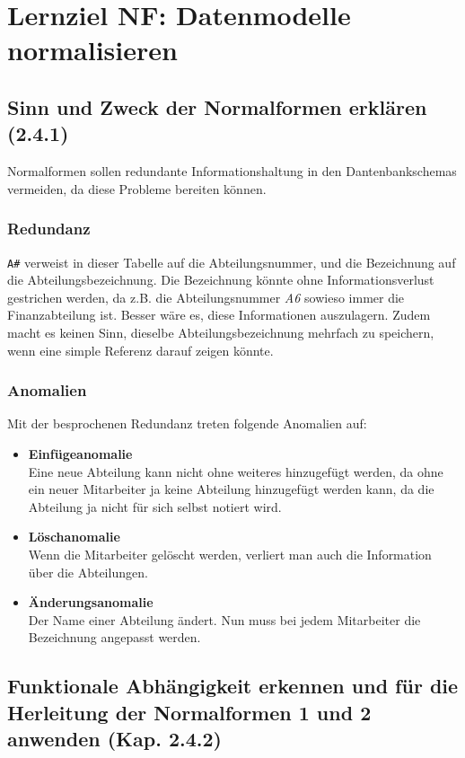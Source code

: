 \section{Lernziel NF: Datenmodelle normalisieren}

\subsection{Sinn und Zweck der Normalformen erklären (2.4.1)}
Normalformen sollen redundante Informationshaltung in den Dantenbankschemas vermeiden, da diese Probleme bereiten können.

\subsubsection{Redundanz}
\texttt{A\#} verweist in dieser Tabelle auf die Abteilungsnummer, und die Bezeichnung auf die Abteilungsbezeichnung. Die Bezeichnung könnte ohne Informationsverlust gestrichen werden, da z.B. die Abteilungsnummer \textit{A6} sowieso immer die Finanzabteilung ist. Besser wäre es, diese Informationen auszulagern. Zudem macht es keinen Sinn, dieselbe Abteilungsbezeichnung mehrfach zu speichern, wenn eine simple Referenz darauf zeigen könnte.

\subsubsection{Anomalien}
Mit der besprochenen Redundanz treten folgende Anomalien auf:
\begin{itemize}
  \item \textbf{Einfügeanomalie} \\
  Eine neue Abteilung kann nicht ohne weiteres hinzugefügt werden, da ohne ein neuer Mitarbeiter ja keine Abteilung hinzugefügt werden kann, da die Abteilung ja nicht für sich selbst notiert wird.
  \item \textbf{Löschanomalie} \\
  Wenn die Mitarbeiter gelöscht werden, verliert man auch die Information über die Abteilungen.
  \item \textbf{Änderungsanomalie} \\
  Der Name einer Abteilung ändert. Nun muss bei jedem Mitarbeiter die Bezeichnung angepasst werden.
\end{itemize}


\subsection{Funktionale Abhängigkeit erkennen und für die Herleitung der Normalformen 1 und 2 anwenden (Kap. 2.4.2)}
